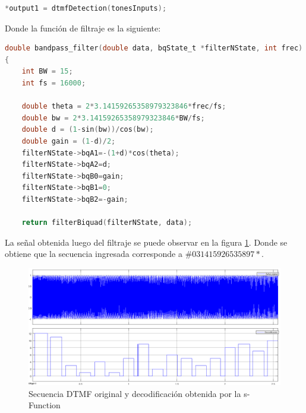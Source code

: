\documentclass[letterpaper,onecolumn,10pt,journal,final]{IEEEtran}
\begin{document}
\begin{enumerate}[1)]
\begin{lstlisting}[language=C]
    *output1 = dtmfDetection(tonesInputs);
    \end{lstlisting}
    Donde la función de filtraje es la siguiente:
    \begin{lstlisting}[language=C]
    double bandpass_filter(double data, bqState_t *filterNState, int frec)
{
    int BW = 15;
    int fs = 16000;
    
    double theta = 2*3.14159265358979323846*frec/fs;
    double bw = 2*3.14159265358979323846*BW/fs;
    double d = (1-sin(bw))/cos(bw);
    double gain = (1-d)/2;
    filterNState->bqA1=-(1+d)*cos(theta);
    filterNState->bqA2=d;
    filterNState->bqB0=gain;
    filterNState->bqB1=0;
    filterNState->bqB2=-gain;

    return filterBiquad(filterNState, data);
    \end{lstlisting}
    
    La señal obtenida luego del filtraje se puede observar en la figura \ref{fig:VI-3}. Donde se obtiene que la secuencia ingresada corresponde a $\#031415926535897*$.
    
    \begin{figure}[H]
        \centering
        \includegraphics[width=0.8 \linewidth]{Figuras/VI-3.png}
        \caption{Secuencia DTMF original y decodificación obtenida por la s-Function}
        \label{fig:VI-3}
    \end{figure}
    

\end{enumerate}
\end{document}
